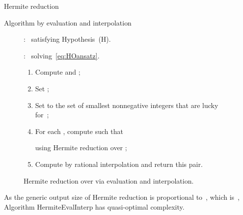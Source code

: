 \documentclass{sig-alt-full}
\begin{document}
\begin{section}{Hermite reduction}
\begin{subsection}{Algorithm by evaluation and interpolation}
\begin{figure}
{\begin{minipage}{8.1cm}
{\smallskip

\noindent {}:~ satisfying Hypothesis~(H).

\noindent {}:~
solving~\eqref{eq:HOansatz}.
\begin{enumerate}
\item Compute  and ;
\item Set ;
\item Set  to the set of  smallest nonnegative integers that are lucky for~;
\item For each , compute  such that

using Hermite reduction over ;
\item Compute  by rational interpolation and return this pair.
\end{enumerate}}
\end{minipage}}
\caption{Hermite reduction over  via evaluation and
interpolation.} \label{fig:HREvaInter}
\vskip-10pt
\end{figure}

\end{subsection}

\vspace{-0.14cm}
As the generic output size of Hermite reduction is proportional
to~, which is~, Algorithm
\textsf{HermiteEvalInterp} has quasi-optimal complexity.
\end{section}
\end{document}
